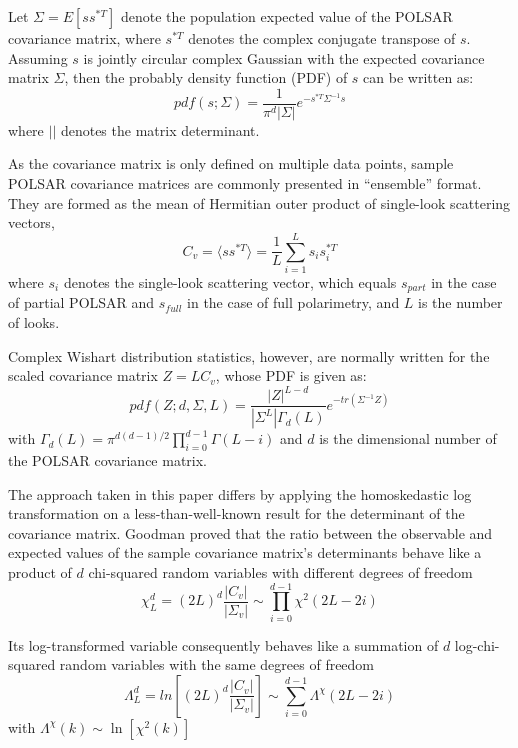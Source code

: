 \documentclass[journal]{IEEEtran}
\begin{document}
Let $\Sigma=E [ss^{*T}]$ denote the population expected value of the POLSAR covariance matrix,
  where $s^{*T}$ denotes the complex conjugate transpose of $s$. 
Assuming %
  $s$ is jointly circular complex Gaussian with the expected covariance matrix $\Sigma$,
  then the probably density function (PDF) of $s$ can be written as:
\begin{equation}
  pdf(s;\Sigma)=\frac{1}{\pi^d|\Sigma|} e^{-s^{*T}\Sigma^{-1}s}
\end{equation}
where $||$ denotes the matrix determinant.

As the covariance matrix is only defined on multiple data points,
  sample POLSAR covariance matrices are commonly presented in ``ensemble'' format.
They are formed as the mean of Hermitian outer product of single-look scattering vectors,
\begin{equation}
  C_v = \langle ss^{*T} \rangle = \frac{1}{L} \sum^L_{i=1}s_is_i^{*T}
\end{equation}
where $s_i$ denotes the single-look scattering vector,
  which equals $s_{part}$ in the case of partial POLSAR and
  $s_{full}$ in the case of full polarimetry,
and $L$ is the number of looks.

Complex Wishart distribution statistics, however, are normally written for the scaled covariance matrix
$Z=LC_v$, whose PDF is given as:
\begin{equation}
  pdf(Z;d,\Sigma,L)=\frac{|Z|^{L-d}}{|\Sigma^L|\Gamma_d(L)}e^{-tr(\Sigma^{-1}Z)}
\end{equation}
with $\Gamma_d(L) = \pi^{d(d-1)/2} \prod^{d-1}_{i=0}\Gamma(L-i)$
and $d$ is the dimensional number of the POLSAR covariance matrix.

The approach taken in this paper differs by applying the homoskedastic log transformation  on a less-than-well-known result for the determinant of the covariance matrix.
Goodman \cite{Goodman_1963_AMS_178} proved
that the ratio between the observable and expected values of the sample covariance matrix's determinants
  behave like a product of $d$ chi-squared random variables with different degrees of freedom 
\begin{equation}
\chi^d_L = (2L)^d \frac{|C_v|}{|\Sigma_v|} \sim \prod_{i=0}^{d-1} \chi^2 (2L-2i)
\label{eqn:prod_chi_squared_rv}  
\end{equation}

Its log-transformed variable consequently 
  behaves like a summation of $d$ log-chi-squared random variables with the same degrees of freedom  
\begin{equation}
\Lambda^d_L = ln \left[ (2L)^d \frac{|C_v|}{|\Sigma_v|} \right] \sim \sum_{i=0}^{d-1} \Lambda^\chi (2L-2i)
\label{eqn:sum_log_chi_squared_rv}
\end{equation}
with
  $\Lambda^\chi (k) \sim \ln \left[ \chi^2 (k) \right]$
\end{document}
